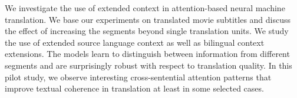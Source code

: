 We investigate the use of extended context in attention-based neural machine translation. We base our experiments on translated movie subtitles and discuss the effect of increasing the segments beyond single translation units. We study the use of extended source language context as well as bilingual context extensions. The models learn to distinguish between information from different segments and are surprisingly robust with respect to translation quality. In this pilot study, we observe interesting cross-sentential attention patterns that improve textual coherence in translation at least in some selected cases.
